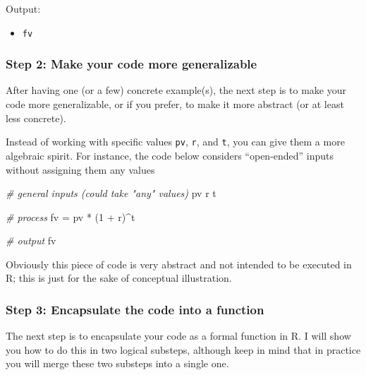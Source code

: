 \documentclass[
]{book}
\newenvironment{Shaded}{\begin{snugshade}}{\end{snugshade}}
\newcommand{\CommentTok}[1]{\textcolor[rgb]{0.56,0.35,0.01}{\textit{#1}}}
\newcommand{\DecValTok}[1]{\textcolor[rgb]{0.00,0.00,0.81}{#1}}
\newcommand{\NormalTok}[1]{#1}
\newcommand{\OtherTok}[1]{\textcolor[rgb]{0.56,0.35,0.01}{#1}}
\newcommand{\SpecialCharTok}[1]{\textcolor[rgb]{0.00,0.00,0.00}{#1}}
\providecommand{\tightlist}{%
  \setlength{\itemsep}{0pt}\setlength{\parskip}{0pt}}
\begin{document}
Output:

\begin{itemize}
\tightlist
\item
  \texttt{fv}
\end{itemize}

\hypertarget{step-2-make-your-code-more-generalizable}{%
\subsubsection*{Step 2: Make your code more generalizable}\label{step-2-make-your-code-more-generalizable}}

After having one (or a few) concrete example(s), the next step is to make your
code more generalizable, or if you prefer, to make it more abstract (or at
least less concrete).

Instead of working with specific values \texttt{pv}, \texttt{r}, and \texttt{t}, you can give them
a more algebraic spirit. For instance, the code below considers ``open-ended''
inputs without assigning them any values

\begin{Shaded}
\begin{Highlighting}[]
\CommentTok{\# general inputs (could take "any" values)}
\NormalTok{pv}
\NormalTok{r}
\NormalTok{t}

\CommentTok{\# process}
\NormalTok{fv }\OtherTok{=}\NormalTok{ pv }\SpecialCharTok{*}\NormalTok{ (}\DecValTok{1} \SpecialCharTok{+}\NormalTok{ r)}\SpecialCharTok{\^{}}\NormalTok{t}

\CommentTok{\# output}
\NormalTok{fv}
\end{Highlighting}
\end{Shaded}

Obviously this piece of code is very abstract and not intended to be executed
in R; this is just for the sake of conceptual illustration.

\hypertarget{step-3-encapsulate-the-code-into-a-function}{%
\subsubsection*{Step 3: Encapsulate the code into a function}\label{step-3-encapsulate-the-code-into-a-function}}

The next step is to encapsulate your code as a formal function in R. I will
show you how to do this in two logical substeps, although keep in mind that in
practice you will merge these two substeps into a single one.
\end{document}
